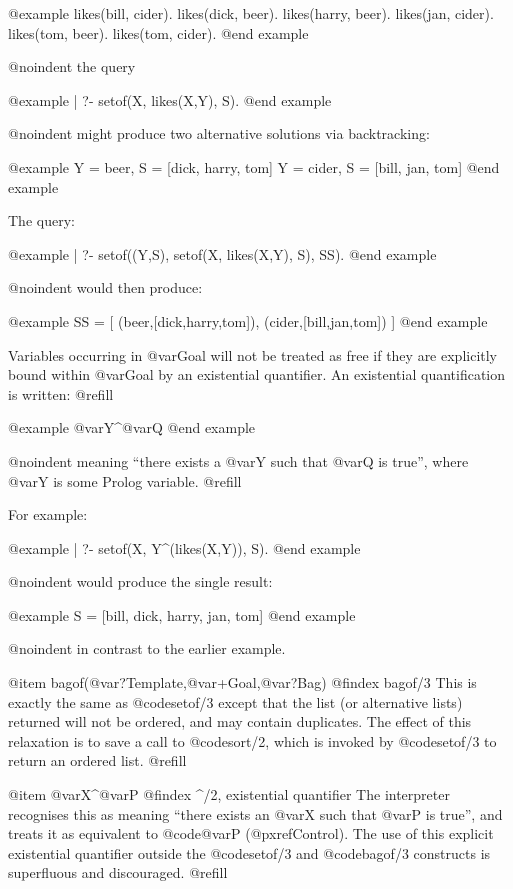 @example
likes(bill, cider).
likes(dick, beer).
likes(harry, beer).
likes(jan, cider).
likes(tom, beer).
likes(tom, cider).
@end example

@noindent
the query

@example
| ?- setof(X, likes(X,Y), S).
@end example

@noindent
might produce two alternative solutions via backtracking:

@example
Y = beer,   S = [dick, harry, tom]
Y = cider,  S = [bill, jan, tom]
@end example

The query:

@example
| ?- setof((Y,S), setof(X, likes(X,Y), S), SS).
@end example

@noindent
would then produce:  

@example
SS = [ (beer,[dick,harry,tom]), (cider,[bill,jan,tom]) ]
@end example

Variables occurring in @var{Goal} will not be treated as free if they are
explicitly bound within @var{Goal} by an existential quantifier.  An
existential quantification is written: @refill

@example
@var{Y}^@var{Q}
@end example

@noindent
meaning ``there exists a @var{Y} such that @var{Q} is true'', where
@var{Y} is some Prolog variable. @refill

For example:  

@example
| ?- setof(X, Y^(likes(X,Y)), S).
@end example

@noindent
would produce the single result:  

@example
S = [bill, dick, harry, jan, tom]
@end example

@noindent
in contrast to the earlier example.

@item bagof(@var{?Template},@var{+Goal},@var{?Bag})
@findex bagof/3
This is exactly the same as @code{setof/3} except that the list (or
alternative lists) returned will not be ordered, and may contain
duplicates.  The effect of this relaxation is to save a call to
@code{sort/2}, which is invoked by @code{setof/3} to return an ordered
list. @refill

@item @var{X}^@var{P}
@findex ^/2, existential quantifier
The interpreter recognises this as meaning ``there exists an @var{X}
such that @var{P} is true'', and treats it as equivalent to
@code{@var{P}} (@pxref{Control}).  The use of this explicit
existential quantifier outside the @code{setof/3} and @code{bagof/3}
constructs is superfluous and discouraged. @refill


